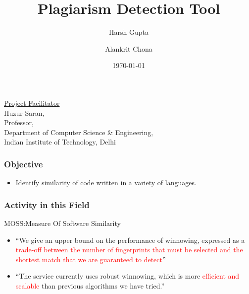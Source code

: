 \documentclass[english,handout]{beamer}
\institute[IITD]{Indian Institute Of Technology, Delhi}
\author[Harsh \and Alankrit]{Harsh Gupta \and Alankrit Chona}
\title{Plagiarism Detection Tool}
\date[\today]{\today}
\begin{document}
\begin{frame}[plain]
\maketitle
\underline{Project Facilitator} \\
Huzur Saran,\\
Professor,\\
Department of Computer Science \& Engineering,\\
Indian Institute of Technology, Delhi\\
\note{\textcolor{red}{Harsh}}
\end{frame}
\begin{frame}
\frametitle{Objective}
\begin{itemize}
\item{Identify similarity of code written in a variety of languages.}
\end{itemize}
\note{\textcolor{red}{Harsh\\}}
\end{frame}

\begin{frame}
\frametitle{Activity in this Field}
\begin{block}{MOSS:Measure Of Software Similarity}
\begin{itemize}
\item{``We give an upper bound on the performance of winnowing, expressed as a \textcolor{red}{ trade-off between the number of fingerprints that must be selected and the shortest match that we are guaranteed to detect}''}
\item{``The service currently uses robust winnowing, which is more \textcolor{red}{efficient and scalable} than previous algorithms we have tried.''}
\end{itemize}
\end{block}
\note{\textcolor{red}{Harsh\\}}
\end{frame}
\end{document}
